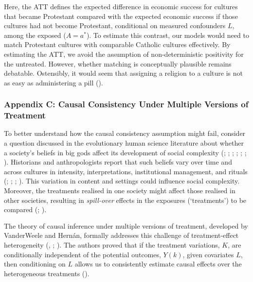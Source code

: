 \documentclass[
  single column]{article}
\begin{document}
Here, the ATT defines the expected difference in economic success for
cultures that became Protestant compared with the expected economic
success if those cultures had not become Protestant, conditional on
measured confounders \(L\), among the exposed (\(A = a^*\)). To estimate
this contrast, our models would need to match Protestant cultures with
comparable Catholic cultures effectively. By estimating the ATT, we
avoid the assumption of non-deterministic positivity for the untreated.
However, whether matching is conceptually plausible remains debatable.
Ostensibly, it would seem that assigning a religion to a culture is not
as easy as administering a pill ().

\newpage{}

\subsubsection{Appendix C: Causal Consistency Under Multiple Versions of
Treatment}\label{id-app-c}

To better understand how the causal consistency assumption might fail,
consider a question discussed in the evolutionary human science
literature about whether a society's beliefs in big gods affect its
development of social complexity (; ;
;
;
;
;
).
Historians and anthropologists report that such beliefs vary over time
and across cultures in intensity, interpretations, institutional
management, and rituals (; ;
;
). This variation in content
and settings could influence social complexity. Moreover, the treatments
realised in one society might affect those realised in other societies,
resulting in \emph{spill-over} effects in the exposures (`treatments')
to be compared (;
).

The theory of causal inference under multiple versions of treatment,
developed by VanderWeele and Hernán, formally addresses this challenge
of treatment-effect heterogeneity
(,
;
). The
authors proved that if the treatment variations, \(K\), are
conditionally independent of the potential outcomes, \(Y(k)\), given
covariates \(L\), then conditioning on \(L\) allows us to consistently
estimate causal effects over the heterogeneous treatments
().
\end{document}
